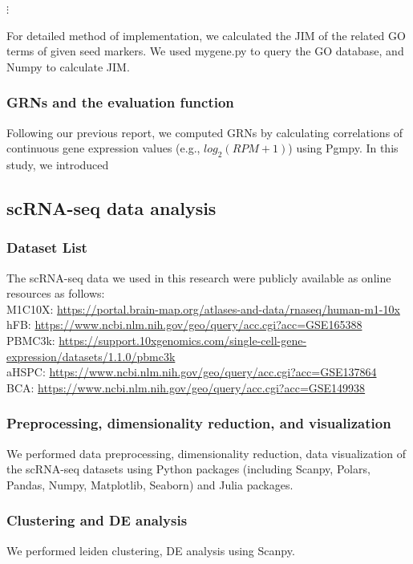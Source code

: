 \documentclass{article}
\begin{document}
$\vdots$

For detailed method of implementation, we calculated the JIM of the related GO terms of given seed markers. We used mygene.py\cite{mygene} to query the GO database, and Numpy\cite{numpy} to calculate JIM.

\subsubsection*{GRNs and the evaluation function}
Following our previous report\cite{okano2023set}, we computed GRNs by calculating
correlations of continuous gene expression values (e.g., $log_2(RPM+1)$) using Pgmpy\cite{pgmpy}. In this study, we introduced

\subsection*{scRNA-seq data analysis}
\subsubsection*{Dataset List}
The scRNA-seq data we used in this research were publicly available as online
resources as follows:\\
M1C10X: \url{https://portal.brain-map.org/atlases-and-data/rnaseq/human-m1-10x}\\
hFB: \url{https://www.ncbi.nlm.nih.gov/geo/query/acc.cgi?acc=GSE165388}\\
PBMC3k: \url{https://support.10xgenomics.com/single-cell-gene-expression/datasets/1.1.0/pbmc3k}\\
aHSPC: \url{https://www.ncbi.nlm.nih.gov/geo/query/acc.cgi?acc=GSE137864}\\
BCA: \url{https://www.ncbi.nlm.nih.gov/geo/query/acc.cgi?acc=GSE149938}\\
\subsubsection*{Preprocessing, dimensionality reduction, and visualization}
We performed data preprocessing, dimensionality reduction, data visualization
of the scRNA-seq datasets using Python packages (including Scanpy\cite{scanpy}, Polars,
Pandas\cite{pandas}, Numpy, Matplotlib\cite{matplotlib}, Seaborn\cite{seaborn}) and Julia packages.
\subsubsection*{Clustering and DE analysis}
We performed leiden clustering, DE analysis using Scanpy.
\end{document}
